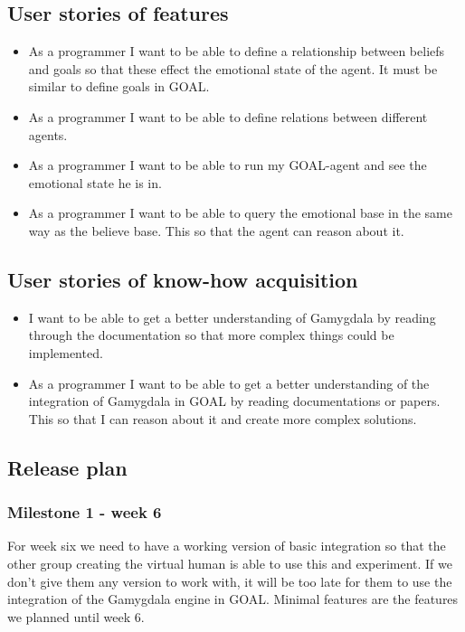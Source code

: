 \documentclass[]{article}
\begin{document}
\subsection{User stories of features}
\begin{itemize}
\item As a programmer I want to be able to define a relationship between beliefs and goals so that these effect the emotional state of the agent. It must be similar to define goals in GOAL.

\item As a programmer I want to be able to define relations between different agents.

\item As a programmer I want to be able to run my GOAL-agent and see the emotional state he is in.

\item As a programmer I want to be able to query the emotional base in the same way as the believe base. This so that the agent can reason about it.
\end{itemize}

\subsection{User stories of know-how acquisition}
\begin{itemize}
\item I want to be able to get a better understanding of Gamygdala by reading through the documentation so that more complex things could be implemented.

\item As a programmer I want to be able to get a better understanding of the integration of Gamygdala in GOAL by reading documentations or papers. This so that I can reason about it and create more complex solutions.
\end{itemize}

\subsection{Release plan}
\subsubsection{Milestone 1 - week 6}
For week six we need to have a working version of basic integration so that the other group creating the virtual human is able to use this and experiment. If we don't give them any version to work with, it will be too late for them to use the integration of the Gamygdala engine in GOAL. Minimal features are the features we planned until week 6.
\end{document}
